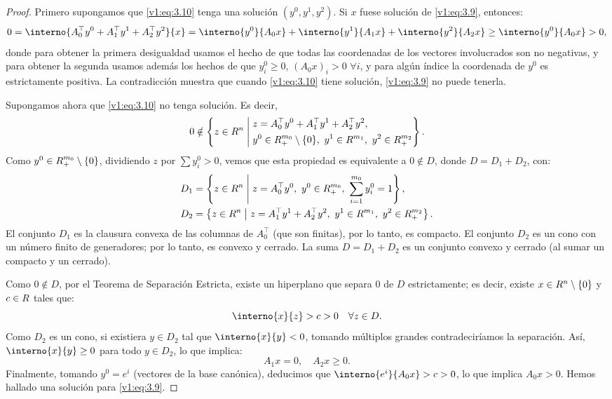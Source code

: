 \begin{proof}
 Primero supongamos que \eqref{v1:eq:3.10} tenga una solución $(y^0, y^1, y^2)$. Si $x$ fuese solución de \eqref{v1:eq:3.9}, entonces:
 \[
 0 = \interno{A_0^\top y^0 + A_1^\top y^1 + A_2^\top y^2}{x} = \interno{y^0}{A_0 x} + \interno{y^1}{A_1 x} + \interno{y^2}{A_2 x} \ge \interno{y^0}{A_0 x} > 0,
 \]
 donde para obtener la primera desigualdad usamos el hecho de que todas las coordenadas de los vectores involucrados son no negativas, y para obtener la segunda usamos además los hechos de que $y_i^0 \ge 0$, $(A_0 x)_i > 0$ $\forall i$, y para algún índice la coordenada de $y^0$ es estrictamente positiva. La contradicción muestra que cuando \eqref{v1:eq:3.10} tiene solución, \eqref{v1:eq:3.9} no puede tenerla.

 Supongamos ahora que \eqref{v1:eq:3.10} no tenga solución. Es decir,
 \[
 0 \notin \left\{ z \in R^n \;\middle|\; \begin{aligned} &z = A_0^\top y^0 + A_1^\top y^1 + A_2^\top y^2, \\ &y^0 \in R^{m_0}_+ \setminus \{0\}, \ y^1 \in R^{m_1}, \ y^2 \in R^{m_2}_+ \end{aligned} \right\}.
 \]
 Como $y^0 \in R^{m_0}_+ \setminus \{0\}$, dividiendo $z$ por $\sum y_i^0 > 0$, vemos que esta propiedad es equivalente a $0 \notin D$, donde $D = D_1 + D_2$, con:
 \begin{align*}
 D_1 &= \left\{ z \in R^n \;\middle|\; z = A_0^\top y^0, \ y^0 \in R^{m_0}_+, \ \sum_{i=1}^{m_0} y_i^0 = 1 \right\}, \\
 D_2 &= \left\{ z \in R^n \;\middle|\; z = A_1^\top y^1 + A_2^\top y^2, \ y^1 \in R^{m_1}, \ y^2 \in R^{m_2}_+ \right\}.
 \end{align*}
 El conjunto $D_1$ es la clausura convexa de las columnas de $A_0^\top$ (que son finitas), por lo tanto, es compacto. El conjunto $D_2$ es un cono con un número finito de generadores; por lo tanto, es convexo y cerrado. La suma $D = D_1 + D_2$ es un conjunto convexo y cerrado (al sumar un compacto y un cerrado).
 
 Como $0 \notin D$, por el Teorema de Separación Estricta, existe un hiperplano que separa $0$ de $D$ estrictamente; es decir, existe $x \in R^n \setminus \{0\}$ y $c \in R$ tales que:
 \[
 \interno{x}{z} > c > 0 \quad \forall z \in D. \label{v1:eq:3.11}
 \]
 Como $D_2$ es un cono, si existiera $y \in D_2$ tal que $\interno{x}{y} < 0$, tomando múltiplos grandes contradeciríamos la separación. Así, $\interno{x}{y} \ge 0$ para todo $y \in D_2$, lo que implica:
 \[
 A_1 x = 0, \quad A_2 x \ge 0.
 \]
 Finalmente, tomando $y^0 = e^i$ (vectores de la base canónica), deducimos que $\interno{e^i}{A_0 x} > c > 0$, lo que implica $A_0 x > 0$. Hemos hallado una solución para \eqref{v1:eq:3.9}.
\end{proof}

